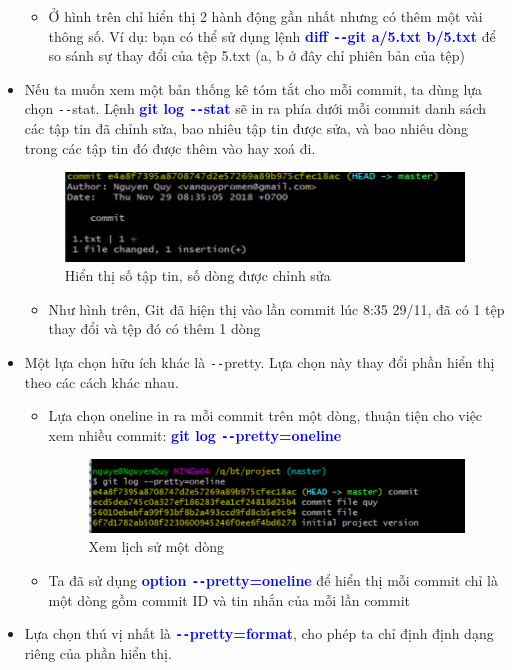 \documentclass[12pt,a4paper]{report}
\begin{document}
\begin{itemize}
\begin{itemize}
\item Ở hình trên chỉ hiển thị 2 hành động gần nhất nhưng có thêm một vài thông số. Ví dụ: bạn có thể sử dụng lệnh \textcolor{blue}{\bf diff \texttt{-{}-}git a/5.txt b/5.txt} để so sánh sự thay đổi của tệp 5.txt (a, b ở đây chỉ phiên bản của tệp)\vskip 0.4cm
\end{itemize}
\item Nếu ta muốn xem một bản thống kê tóm tắt cho mỗi commit, ta dùng lựa chọn \texttt{-{}-}stat. Lệnh \textcolor{blue}{\bf git log \texttt{-{}-}stat} sẽ in ra phía dưới mỗi commit danh sách các tập tin đã chỉnh sửa, bao nhiêu tập tin được sửa, và bao nhiêu dòng trong các tập tin đó được thêm vào hay xoá đi.

\begin{figure}[!ht]
	\centering
	\includegraphics[width=0.8\linewidth]{screenshot019}
\caption{Hiển thị số tập tin, số dòng được chỉnh sửa}
	\label{fig:screenshot019}
	\end{figure}
	
\begin{itemize}
\item Như hình trên, Git đã hiện thị vào lần commit lúc 8:35 29/11, đã có 1 tệp thay đổi và tệp đó có thêm 1 dòng
\end{itemize}
\item Một lựa chọn hữu ích khác là \texttt{-{}-}pretty. Lựa chọn này thay đổi phần hiển thị theo các cách khác nhau.
\begin{itemize}
\item Lựa chọn oneline in ra mỗi commit trên một dòng, thuận tiện cho việc xem nhiều commit: \textcolor{blue}{\bf git log \texttt{-{}-}pretty=oneline}

\begin{figure}[!ht]
	\centering
	\includegraphics[width=0.8\linewidth]{screenshot020}
	\caption{Xem lịch sử một dòng}
	\label{fig:screenshot020}
	\end{figure}

\item Ta đã sử dụng \textcolor{blue}{\bf option \texttt{-{}-}pretty=oneline} để hiển thị mỗi commit chỉ là một dòng gồm commit ID và tin nhắn của mỗi lần commit
\end{itemize}
\item Lựa chọn thú vị nhất là \textcolor{blue}{\bf \texttt{-{}-}pretty=format}, cho phép ta chỉ định định dạng riêng của phần hiển thị.


\end{itemize}
\end{document}
